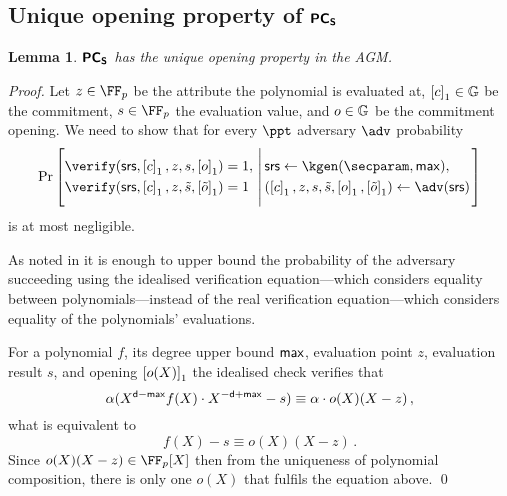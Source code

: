 \documentclass[runningheads,11pt]{llncs}
\newtheorem{lemma}[theorem]{Lemma} \newtheorem{corollary}[theorem]{Corollary}
\theoremstyle{definition} \newtheorem{definition}[theorem]{Definition}
\begin{document}
\subsection{Unique opening property of $\bm{\mathsf{PC}}_{\bm{\mathsf{S}}}$}
\begin{lemma}
\label{lem:pcoms_unique_op}
$\bm{\mathsf{PC}}_{\bm{\mathsf{S}}}$ has the unique opening property in the AGM. 
\end{lemma}
\begin{proof}
Let 
$z \in \FF_p$ be the attribute the polynomial is evaluated at,
$\left[c\right]_{1} \in \mathbb{G}$ be the commitment,  
$s \in \FF_p$ the evaluation value, and 
$o \in \mathbb{G}$ be the commitment opening. 
We need to show that for every $\ppt$ adversary $\adv$ probability
\[
  \Pr \left[
    \begin{aligned}
      & \verify(\srs, \gone{c}, z, s, \gone{o}) = 1, \\
      & \verify(\srs, \gone{c}, z, \tilde{s}, \gone{\tilde{o}}) = 1
    \end{aligned}
    \,\left|\, \vphantom{\begin{aligned}
          & \verify(\srs, \gone{c}, z, s, \gone{o}),\\
          & \verify(\srs, \gone{c}, z, \tilde{s}, \gone{\tilde{o}}) \\
          &o \neq \tilde{o})
		\end{aligned}}
      \begin{aligned}
        & \srs \gets \kgen(\secparam, \maxdeg), \\
        & (\gone{c}, z, s, \tilde{s}, \gone{o}, \gone{\tilde{o}}) \gets \adv(\srs)
      \end{aligned}
    \right.\right]
\]
is at most negligible.

As noted in \cite[Lemma 2.2]{EPRINT:GabWilCio19} it is enough to upper bound the
probability of the adversary succeeding using the idealised verification
equation---which considers equality between polynomials---instead of the real
verification equation---which considers equality of the polynomials' evaluations.

For a polynomial $f$, its degree upper bound $\mathsf{max}$, evaluation point $z$,
evaluation result $s$, and opening $\left[o(X)\right]_{1}$ the idealised check verifies that
\begin{equation}
  \alpha (X^{\mathsf{d} - \mathsf{max}}f(X) \cdot X^{-\mathsf{d} + \mathsf{max}} -  s) \equiv \alpha \cdot o(X) (X - z)\,,
\end{equation}
what is equivalent to 
\begin{equation}
	f(X) -  s \equiv o(X) (X - z)\,.
	\label{eq:pcoms_idealised_check}
\end{equation}
Since $o(X)(X - z) \in \FF_p[X]$ then from the uniqueness of polynomial
composition, there is only one $o(X)$ that fulfils the equation above.
\qed
\end{proof}
\end{document}
